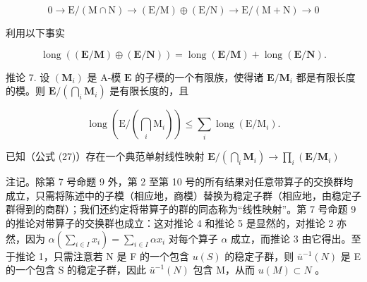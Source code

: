 \[
0 \rightarrow \mathrm{E} / (\mathrm{M} \cap \mathrm{N}) \rightarrow (\mathrm{E} / \mathrm{M}) \oplus (\mathrm{E} / \mathrm{N}) \rightarrow \mathrm{E} / (\mathrm{M} + \mathrm{N}) \rightarrow 0
\]

利用以下事实

\[
\operatorname{long} ((\mathbf {E} / \mathbf {M}) \oplus (\mathbf {E} / \mathbf {N})) = \operatorname{long} (\mathbf {E} / \mathbf {M}) + \operatorname{long} (\mathbf {E} / \mathbf {N}).
\]

推论 7. 设 \((\mathbf{M}_i)\) 是 A-模 \(\mathbf{E}\) 的子模的一个有限族，使得诸 \(\mathbf{E} / \mathbf{M}_i\) 都是有限长度的模。则 \(\mathbf{E} / (\bigcap_{i} \mathbf{M}_i)\) 是有限长度的，且

\[
\operatorname{long} \left(\mathrm{E} / \left(\bigcap_ {i} \mathrm{M} _ {i}\right)\right) \leqslant \sum_ {i} \operatorname{long} (\mathrm{E} / \mathrm{M} _ {i}).\tag{42}
\]

已知（公式 (27)）存在一个典范单射线性映射 \(\mathbf{E} / \left(\bigcap_{i}\mathbf{M}_{i}\right)\to \prod_{i}(\mathbf{E} / \mathbf{M}_{i})\)

注记。除第 7 号命题 9 外，第 2 至第 10 号的所有结果对任意带算子的交换群均成立，只需将陈述中的子模（相应地，商模）替换为稳定子群（相应地，由稳定子群得到的商群）；我们还约定将带算子的群的同态称为“线性映射”。第 7 号命题 9 的推论对带算子的交换群也成立：这对推论 4 和推论 5 是显然的，对推论 2 亦然，因为 \(\alpha\left(\sum_{i\in I}x_i\right)=\sum_{i\in I}\alpha x_i\) 对每个算子 \(\alpha\) 成立，而推论 3 由它得出。至于推论 1，只需注意若 N 是 F 的一个包含 \(u(S)\) 的稳定子群，则 \(\bar{u}^{-1}(N)\) 是 E 的一个包含 S 的稳定子群，因此 \(\bar{u}^{-1}(N)\) 包含 M，从而 \(u(M)\subset N\) 。


